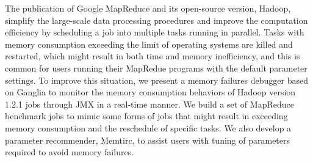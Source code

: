 
The publication of Google MapReduce and its open-source version, Hadoop, simplify the large-scale data processing procedures and improve the computation efficiency by scheduling a job into multiple tasks running in parallel. 
Tasks with memory consumption exceeding the limit of operating systems are killed and restarted, which might result in both time and memory inefficiency, and this is common for users running their MapRedue programs with the default parameter settings.
To improve this situation, we present a memory failures debugger based on Ganglia to monitor the memory consumption behaviors of Hadoop version 1.2.1 jobs through JMX in a real-time manner. We build a set of MapReduce benchmark jobs to mimic some forms of jobs that might result in exceeding memory consumption and the reschedule of specific tasks. We also develop a parameter recommender, Memtirc, to assist users with tuning of parameters required to avoid memory failures.

